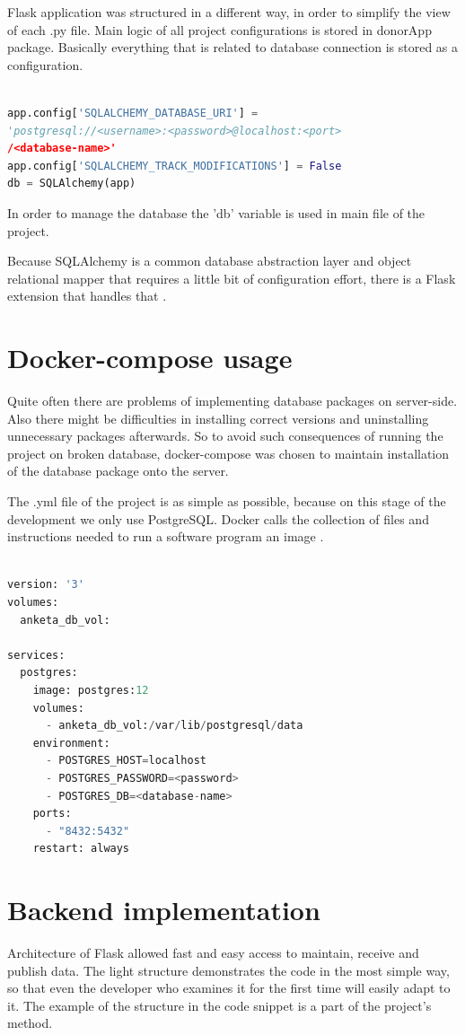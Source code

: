 Flask application was structured in a different way, in order to simplify the view of each .py file. Main logic of all project configurations is stored in donorApp package. Basically everything that is related to database connection is stored as a configuration.

\begin{lstlisting}[language=Python]

app.config['SQLALCHEMY_DATABASE_URI'] =
'postgresql://<username>:<password>@localhost:<port>
/<database-name>'
app.config['SQLALCHEMY_TRACK_MODIFICATIONS'] = False
db = SQLAlchemy(app)

\end{lstlisting}
In order to manage the database the 'db' variable is used in main file of the project.
\par
Because SQLAlchemy is a common database abstraction layer and object relational mapper that requires a little bit of configuration effort, there is a Flask extension that handles that \cite{flasksql}.

\section{Docker-compose usage}
Quite often there are problems of implementing database packages on server-side. Also there might be difficulties in installing correct versions  and uninstalling unnecessary packages afterwards. So to avoid such consequences of running the project on broken database, docker-compose was chosen to maintain installation of the database package onto the server.
\par
The .yml file of the project is as simple as possible, because on this stage of the development we only use PostgreSQL. Docker calls the collection of files and instructions needed to run a software program an image \cite{docker}. 

\begin{lstlisting}[language=Python]

version: '3'
volumes:
  anketa_db_vol:

services:
  postgres:
    image: postgres:12
    volumes:
      - anketa_db_vol:/var/lib/postgresql/data
    environment:
      - POSTGRES_HOST=localhost
      - POSTGRES_PASSWORD=<password>
      - POSTGRES_DB=<database-name>
    ports:
      - "8432:5432"
    restart: always

\end{lstlisting}

\section{Backend implementation}
Architecture of Flask allowed fast and easy access to maintain, receive and publish data. The light structure demonstrates the code in the most simple way, so that even the developer who examines it for the first time will easily adapt to it. The example of the structure in the code snippet is a part of the project's method.

